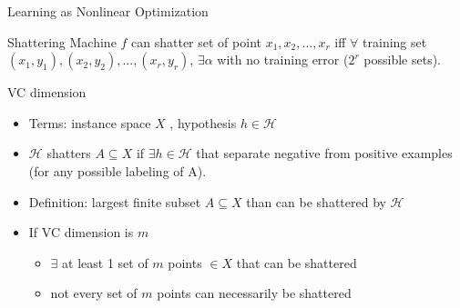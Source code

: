 \documentclass[9pt,t]{beamer}
\begin{document}
\begin{frame}{Learning as Nonlinear Optimization}
    \begin{alertblock}{Shattering}
        Machine $ f $ can shatter set of point $ x_1, x_2, ..., x_r $ iff $ \forall $ training set $ (x_1, y_1), (x_2, y_2), ... , (x_r, y_r) $, $ \exists \alpha $ with no training error ($ 2^r $ possible sets).
    \end{alertblock}
    \begin{alertblock}{VC dimension}
        \begin{itemize}
            \item Terms: instance space $ X $ , hypothesis $ h \in \mathcal{H} $
            \item $ \mathcal{H} $ shatters $ A \subseteq X $ if $ \exists h \in \mathcal{H} $ that separate negative from positive examples (for any possible labeling of A).
            \item Definition: largest finite subset $ A \subseteq X $ than can be shattered by $ \mathcal{H} $
            \item If VC dimension is $ m $
            \begin{itemize}
                \item $ \exists $ at least 1 set of $ m $ points $ \in X $ that can be shattered
                \item not every set of $ m $ points can necessarily be shattered
            \end{itemize}
        \end{itemize}
    \end{alertblock}
\end{frame}

\end{document}
